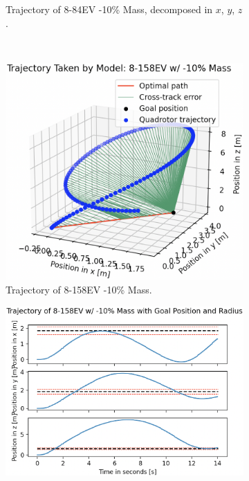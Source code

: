 \begin{figure}[H]
\begin{subfigure}[b]{0.49\textwidth}
         \caption{Trajectory of 8-84EV -10\% Mass, decomposed in $x$, $y$, $z$.}
         \label{fig:testing_robust-10_ppo884EV2}
     \end{subfigure} 
     \hfill \\[1mm]
    \begin{subfigure}[b]{0.48\textwidth}
         \centering
         \captionsetup{justification=centering}
         \includegraphics[width=\textwidth]{figures/5_/Testing/ppo_test_robust-10-8158EV1.png}
         \caption{Trajectory of 8-158EV -10\% Mass.}
         \label{fig:testing_robust-10_ppo8158EV1}
     \end{subfigure} 
     \hfill 
     \begin{subfigure}[b]{0.49\textwidth}
         \centering
         \captionsetup{justification=centering}
         \includegraphics[width=\textwidth]{figures/5_/Testing/ppo_test_robust-10-8158EV2.png}

\end{subfigure}
\end{figure}
